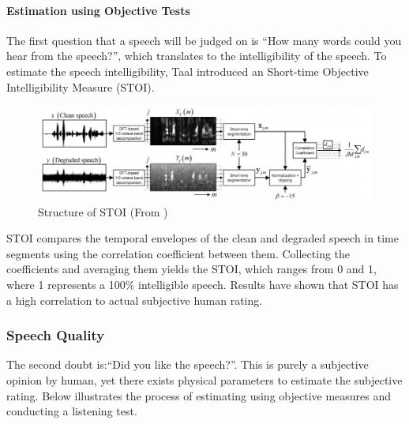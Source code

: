 \documentclass[a4paper,twoside,12pt,hidelinks]{article}
\begin{document}
\paragraph{Estimation using Objective Tests}
The first question that a speech will be judged on is ``How many words could you hear from the speech?'', which translates to the intelligibility of the speech. To estimate the speech intelligibility, Taal \cite{Taal2011AnSpeech} introduced an Short-time Objective Intelligibility Measure (STOI).
\begin{figure}[H]
\centering
\includegraphics[width=\textwidth]{stoi}
\caption{Structure of STOI (From \cite{Taal2011AnSpeech})}
\label{fig:stoi}
\end{figure}
STOI compares the temporal envelopes of the
clean and degraded speech in time segments using the correlation coefficient between them. Collecting the coefficients and averaging them yields the STOI, which ranges from 0 and 1, where 1 represents a 100\% intelligible speech. Results have shown that STOI has a high correlation to actual subjective human rating.

\subsubsection{Speech Quality}
The second doubt is:``Did you like the speech?''. This is purely a subjective opinion by human, yet there exists physical parameters to estimate the subjective rating. Below illustrates the process of estimating using objective measures and conducting a listening test.
\end{document}
